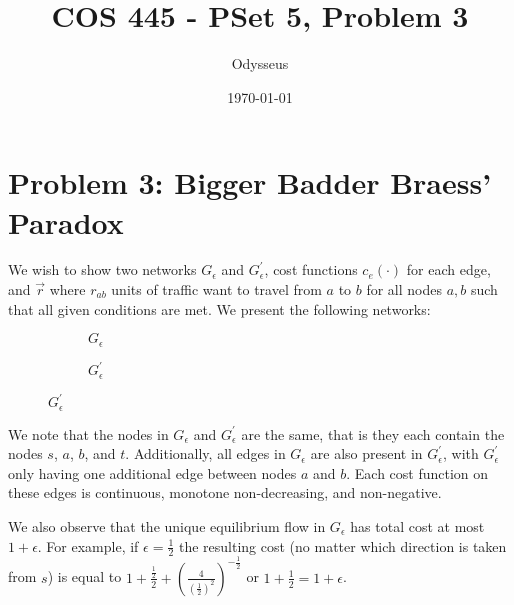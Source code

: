 \documentclass[12pt]{article}%
\begin{document}
\title{COS 445 - PSet 5, Problem 3} %
\author{Odysseus} %
\date{\today}
\maketitle
\section*{Problem 3: Bigger Badder Braess’ Paradox}
We wish to show two networks $G_{\epsilon}$ and $G^{\prime}_{\epsilon}$, cost functions $c_{e}(\cdot)$ for each edge, and $\vec{r}$ where $r_{ab}$ units of traffic want to travel from $a$ to $b$ for all nodes $a, b$ such that all given conditions are met. We present the following networks:

\begin{figure}[h]
\centering
\begin{subfigure}[b]{0.4\linewidth}
\centering
{}
\caption{$G_{\epsilon}$}
\end{subfigure}
\begin{subfigure}[b]{0.4\linewidth}
\centering
{}
\caption{$G^{\prime}_{\epsilon}$}
\end{subfigure}
\end{figure}

We note that the nodes in $G_{\epsilon}$ and $G^{\prime}_{\epsilon}$ are the same, that is they each contain the nodes $s$, $a$, $b$, and $t$. Additionally, all edges in $G_{\epsilon}$ are also present in $G^{\prime}_{\epsilon}$, with $G^{\prime}_{\epsilon}$ only having one additional edge between nodes $a$ and $b$. Each cost function on these edges is continuous, monotone non-decreasing, and non-negative.

We also observe that the unique equilibrium flow in $G_{\epsilon}$ has total cost at most $1 + \epsilon$. For example, if $\epsilon = \frac{1}{2}$ the resulting cost (no matter which direction is taken from $s$) is equal to $1 + \frac{\frac{1}{2}}{2} + (\frac{4}{(\frac{1}{2})^2})^{-\frac{1}{2}}$ or $1 + \frac{1}{2} = 1 + \epsilon$.
\end{document}
